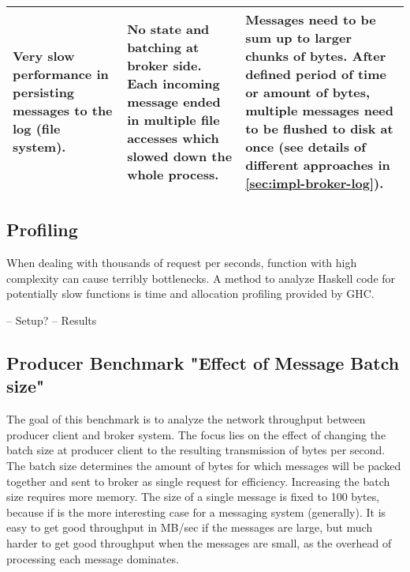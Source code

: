 \begin{table}[H]
\begin{tabular}{|p{4cm}|p{5cm}|p{6cm}|}
Very slow performance in persisting messages to the log (file system).                                 & No state and batching at broker side. Each incoming message ended in multiple file accesses which slowed down the whole process.                                                                                                                                & Messages need to be sum up to larger chunks of bytes. After defined period of time or amount of bytes, multiple messages need to be flushed to disk at once (see details of different approaches in \ref{sec:impl-broker-log}).                                                                                                                                      \\ \hline
\end{tabular}
\end{table}


\subsection{Profiling}
When dealing with thousands of request per seconds, function with high complexity
can cause terribly bottlenecks. A method to analyze Haskell code for
potentially slow functions is time and allocation profiling provided by GHC.

-- Setup?
-- Results 

\subsection{Producer Benchmark "Effect of Message Batch size"}
The goal of this benchmark is to analyze the network throughput between
producer client and broker system.  The focus lies on the effect of changing
the batch size at producer client to the resulting transmission of bytes per
second. The batch size determines the amount of bytes for which messages will
be packed together and sent to broker as single request for efficiency.
Increasing the batch size requires more memory. The size of a single message is
fixed to 100 bytes, because if is the more interesting case for a messaging system
(generally). It is easy to get good throughput in MB/sec if the messages are
large, but much harder to get good throughput when the messages are small, as
the overhead of processing each message dominates. 

